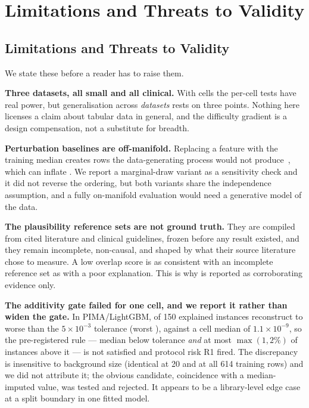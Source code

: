 \chapter{Limitations and Threats to Validity}\label{ch:limitations}

\section{Limitations and Threats to Validity}\label{sec:limitations}

We state these before a reader has to raise them.

\textbf{Three datasets, all small and all clinical.} With \NumCells{} cells the
per-cell tests have real power, but generalisation across \emph{datasets} rests on
three points. Nothing here licenses a claim about tabular data in general, and the
difficulty gradient is a design compensation, not a substitute for breadth.

\textbf{Perturbation baselines are off-manifold.} Replacing a feature with the
training median creates rows the data-generating process would not
produce~\cite{hooker2019benchmark}, which can inflate \aopc{}. We report a
marginal-draw variant as a sensitivity check and it did not reverse the ordering, but
both variants share the independence assumption, and a fully on-manifold evaluation
would need a generative model of the data.

\textbf{The plausibility reference sets are not ground truth.} They are compiled from
cited literature and clinical guidelines, frozen before any result existed, and they
remain incomplete, non-causal, and shaped by what their source literature chose to
measure. A low overlap score is as consistent with an incomplete reference set as with
a poor explanation. This is why  is reported as corroborating evidence only.

\textbf{The additivity gate failed for one cell, and we report it rather than widen the
gate.} In PIMA/LightGBM, \AdditivityWorstOutliers{} of 150 explained instances
reconstruct  to worse than the $5\times10^{-3}$ tolerance (worst
\AdditivityWorstMax{}), against a cell median of $1.1\times10^{-9}$, so the
pre-registered rule --- median below tolerance \emph{and} at most $\max(1, 2\%)$ of
instances above it --- is not satisfied and protocol risk R1 fired. The discrepancy is
insensitive to background size (identical at 20 and at all 614 training rows) and we did
not attribute it; the obvious candidate, coincidence with a median-imputed value, was
tested and rejected. It appears to be a library-level edge case at a split boundary in
one fitted model.

